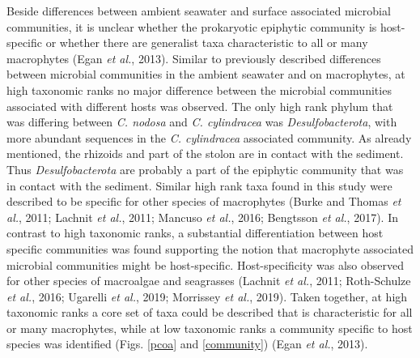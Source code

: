 \documentclass[12pt,]{article}
\begin{document}
Beside differences between ambient seawater and surface associated
microbial communities, it is unclear whether the prokaryotic epiphytic
community is host-specific or whether there are generalist taxa
characteristic to all or many macrophytes (Egan \emph{et al.}, 2013).
Similar to previously described differences between microbial
communities in the ambient seawater and on macrophytes, at high
taxonomic ranks no major difference between the microbial communities
associated with different hosts was observed. The only high rank phylum
that was differing between \emph{C. nodosa} and \emph{C. cylindracea}
was \emph{Desulfobacterota}, with more abundant sequences in the
\emph{C. cylindracea} associated community. As already mentioned, the
rhizoids and part of the stolon are in contact with the sediment. Thus
\emph{Desulfobacterota} are probably a part of the epiphytic community
that was in contact with the sediment. Similar high rank taxa found in
this study were described to be specific for other species of
macrophytes (Burke and Thomas \emph{et al.}, 2011; Lachnit \emph{et
al.}, 2011; Mancuso \emph{et al.}, 2016; Bengtsson \emph{et al.}, 2017).
In contrast to high taxonomic ranks, a substantial differentiation
between host specific communities was found supporting the notion that
macrophyte associated microbial communities might be host-specific.
Host-specificity was also observed for other species of macroalgae and
seagrasses (Lachnit \emph{et al.}, 2011; Roth-Schulze \emph{et al.},
2016; Ugarelli \emph{et al.}, 2019; Morrissey \emph{et al.}, 2019).
Taken together, at high taxonomic ranks a core set of taxa could be
described that is characteristic for all or many macrophytes, while at
low taxonomic ranks a community specific to host species was identified
(Figs. \ref{pcoa} and \ref{community}) (Egan \emph{et al.}, 2013).
\end{document}

